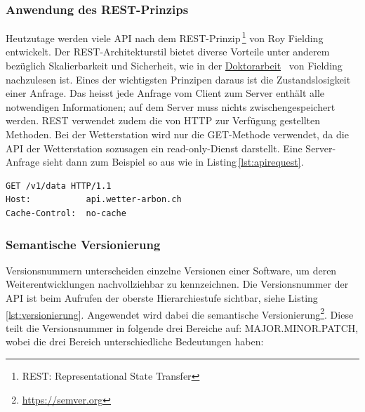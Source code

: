 



\subsubsection{Anwendung des REST-Prinzips}
Heutzutage werden viele API nach dem REST-Prinzip\,\footnote{REST: Representational State Transfer} von Roy Fielding entwickelt. Der REST-Architekturstil bietet diverse Vorteile unter anderem bezüglich Skalierbarkeit und Sicherheit, wie in der \href{https://www.ics.uci.edu/~fielding/pubs/dissertation/top.htm}{Doktorarbeit}~\cite{Fielding:2000:ASD:932295} von Fielding nachzulesen ist. Eines der wichtigsten Prinzipen daraus ist die Zustandslosigkeit einer Anfrage. Das heisst jede Anfrage vom Client zum Server enthält alle notwendigen Informationen; auf dem Server muss nichts zwischengespeichert werden. REST verwendet zudem die von HTTP zur Verfügung gestellten Methoden\cite{LornaJaneMitchell2013oreilly}. Bei der Wetterstation wird nur die GET-Methode verwendet, da die API der Wetterstation sozusagen ein read-only-Dienst darstellt. Eine Server-Anfrage sieht dann zum Beispiel so aus wie in Listing\,\ref{lst:apirequest}.

\vspace{3mm}
\begin{lstlisting}[label=lst:apirequest,caption=Serveranfrage, language=HTML5, style=php]
GET /v1/data HTTP/1.1
Host:           api.wetter-arbon.ch
Cache-Control:  no-cache
\end{lstlisting}
\vspace{3mm}


\subsubsection{Semantische Versionierung}
Versionsnummern unterscheiden einzelne Versionen einer Software, um deren Weiterentwicklungen nachvollziehbar zu kennzeichnen. Die Versionsnummer der API ist beim Aufrufen der oberste Hierarchiestufe sichtbar, siehe Listing\,\ref{lst:versionierung}. Angewendet wird dabei die semantische Versionierung\footnote{\url{https://semver.org}}. Diese teilt die Versionsnummer in folgende drei Bereiche auf: MAJOR.MINOR.PATCH, wobei die drei Bereich unterschiedliche Bedeutungen haben:


